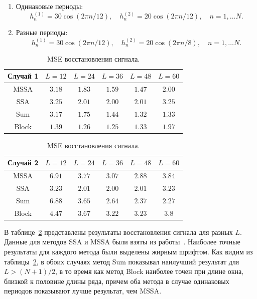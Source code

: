 \documentclass[specialist,
substylefile = spbu_report.rtx,
subf,href,colorlinks=true, 12pt]{disser}
\theoremstyle{definition}
\begin{document}
	\begin{enumerate}
		\item Одинаковые периоды:
		\[
		h_n^{(1)}=30\cos(2\pi n/12),\quad h_n^{(2)}=20\cos(2\pi n/12),\quad n=1,\ldots N.
		\]
		\item Разные периоды:
		\[
		h_n^{(1)}=30\cos(2\pi n/12),\quad h_n^{(2)}=20\cos(2\pi n/8),\quad n=1,\ldots N.
		\]
	\end{enumerate}
		\begin{table}[h]
		\centering
		\caption{MSE восстановления сигнала.}
		\begin{tabular}{cccccc}\hline
			Случай 1 & $L=12$ & $L=24$ & $L=36$ & $L=48$ & $L=60$\\
			\hline
			MSSA & $3.18$ & $1.83$ & $1.59$ & $\mathbf{1.47}$ & $2.00$\\
			\hline
			SSA & $3.25$ & $\mathbf{2.01}$ & $\mathbf{2.00}$ & $\mathbf{2.01}$ & $3.25$\\
			\hline
			Sum &  $3.17$ & $1.75$ & $1.44$ & $\mathbf{1.32}$ & $\mathbf{1.33}$\\
			\hline
			Block & $1.39$ & $\mathbf{1.26}$ & $\mathbf{1.25}$ & $1.33$ & $1.97$\\
			\hline
		\end{tabular}
		\begin{tabular}{cccccc}\hline
			Случай 2 & $L=12$ & $L=24$ & $L=36$ & $L=48$ & $L=60$\\
			\hline
			MSSA & $6.91$ & $3.77$ & $3.07$ & $\mathbf{2.88}$ & $3.84$\\
			\hline
			SSA & $3.23$ & $\mathbf{2.01}$ & $\mathbf{2.00}$ & $\mathbf{2.01}$ & $3.23$\\
			\hline
			Sum & $6.88$ & $3.65$ & $2.64$ & $2.37$ & $\mathbf{2.27}$\\
			\hline
			Block & $4.47$ & $3.67$ & $\mathbf{3.22}$ & $\mathbf{3.23}$ & $3.8$\\
			\hline
		\end{tabular}
		\label{tab:mse}
	\end{table}
	В таблице~\ref{tab:mse} представлены результаты восстановления сигнала для разных $L$. Данные для методов SSA и MSSA были взяты из работы~\cite{Golyandina_2015}. Наиболее точные результаты для каждого метода были выделены жирным шрифтом. Как видим из таблицы~\ref{tab:mse}, в обоих случаях метод Sum показывал наилучший результат для $L>(N+1)/2$, в то время как метод Block наиболее точен при длине окна, близкой к половине длины ряда, причем оба метода в случае одинаковых периодов показывают лучше результат, чем MSSA.
\end{document}
